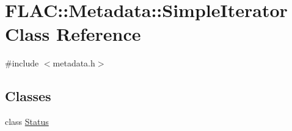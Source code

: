 \hypertarget{class_f_l_a_c_1_1_metadata_1_1_simple_iterator}{}\section{F\+L\+AC\+:\+:Metadata\+:\+:Simple\+Iterator Class Reference}
\label{class_f_l_a_c_1_1_metadata_1_1_simple_iterator}


{\ttfamily \#include $<$metadata.\+h$>$}

\subsection*{Classes}
\begin{DoxyCompactItemize}
\item 
class \hyperlink{class_f_l_a_c_1_1_metadata_1_1_simple_iterator_1_1_status}{Status}
\end{DoxyCompactItemize}
